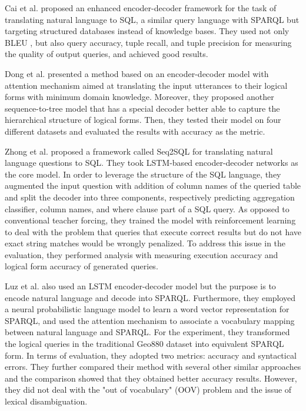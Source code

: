 Cai et al. \cite{Cai2017} proposed an enhanced encoder-decoder framework for the task of translating natural language to SQL, a similar query language with SPARQL but targeting structured databases instead of knowledge bases. They used not only BLEU \cite{Papineni2002}, but also query accuracy, tuple recall, and tuple precision for measuring the quality of output queries, and achieved good results.

Dong et al. \cite{dong2016language} presented a method based on an encoder-decoder model with attention mechanism aimed at translating the input utterances to their logical forms with minimum domain knowledge. Moreover, they proposed another sequence-to-tree model that has a special decoder better able to capture the hierarchical structure of logical forms. Then, they tested their model on four different datasets and evaluated the results with accuracy as the metric.

Zhong et al. \cite{DBLP:journals/corr/abs-1709-00103} proposed a framework called Seq2SQL for translating natural language questions to SQL. They took LSTM-based encoder-decoder networks as the core model. In order to leverage the structure of the SQL language, they augmented the input question with addition of column names of the queried table and split the decoder into three components, respectively predicting aggregation classifier, column names, and where clause part of a SQL query. As opposed to conventional teacher forcing, they trained the model with reinforcement learning to deal with the problem that queries that execute correct results but do not have exact string matches would be wrongly penalized. To address this issue in the evaluation, they performed analysis with measuring execution accuracy and logical form accuracy of generated queries.

Luz et al. \cite{Luz2018} also used an LSTM encoder-decoder model but the purpose is to encode natural language and decode into SPARQL. Furthermore, they employed a neural probabilistic language model to learn a word vector representation for SPARQL, and used the attention mechanism to associate a vocabulary mapping between natural language and SPARQL. For the experiment, they transformed the logical queries in the traditional Geo880 dataset into equivalent SPARQL form. In terms of evaluation, they adopted two metrics: accuracy and syntactical errors. They further compared their method with several other similar approaches \cite{alagha2015using,Kaufmann06querix:a} and the comparison showed that they obtained better accuracy results. However, they did not deal with the "out of vocabulary" (OOV) problem and the issue of lexical disambiguation.

